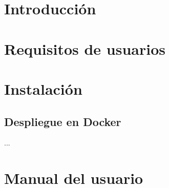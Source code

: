 
\section{Introducción}

\section{Requisitos de usuarios}

\section{Instalación}

\subsection{Despliegue en Docker}
\label{s-e:docker-deploy-users}

...

\section{Manual del usuario}



